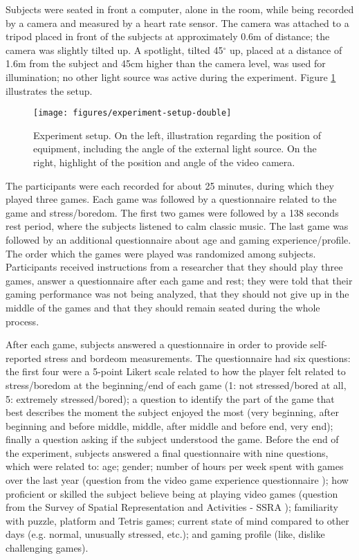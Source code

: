 Subjects were seated in front a computer, alone in the room, while being recorded by a camera and measured by a heart rate sensor. The camera was attached to a tripod placed in front of the subjects at approximately 0.6m of distance; the camera was slightly tilted up. A spotlight, tilted 45$^{\circ}$ up, placed at a distance of 1.6m from the subject and 45cm higher than the camera level, was used for illumination; no other light source was active during the experiment. Figure \ref{fig:setup} illustrates the setup.

\begin{figure}[h]
\centering
\texttt{[image: figures/experiment-setup-double]}
\caption{Experiment setup. On the left, illustration regarding the position of equipment, including the angle of the external light source. On the right, highlight of the position and angle of the video camera.}
\label{fig:setup}
\end{figure}

The participants were each recorded for about 25 minutes, during which they played three games. Each game was followed by a questionnaire related to the game and stress/boredom. The first two games were followed by a 138 seconds rest period, where the subjects listened to calm classic music. The last game was followed by an additional questionnaire about age and gaming experience/profile. The order which the games were played was randomized among subjects. Participants received instructions from a researcher that they should play three games, answer a questionnaire after each game and rest; they were told that their gaming performance was not being analyzed, that they should not give up in the middle of the games and that they should remain seated during the whole process.

After each game, subjects answered a questionnaire in order to provide self-reported stress and bordeom measurements. The questionnaire had six questions: the first four were a 5-point Likert scale related to how the player felt related to stress/boredom at the beginning/end of each game (1: not stressed/bored at all, 5: extremely stressed/bored); a question to identify the part of the game that best describes the moment the subject enjoyed the most (very beginning, after beginning and before middle, middle, after middle and before end, very end); finally a question asking if the subject understood the game. Before the end of the experiment, subjects answered a final questionnaire with nine questions, which were related to: age; gender; number of hours per week spent with games over the last year (question from the video game experience questionnaire \parencite{unsworth2015playing}); how proficient or skilled the subject believe being at playing video games (question from the Survey of Spatial Representation and Activities - SSRA \parencite{terlecki2005important}); familiarity with puzzle, platform and Tetris games; current state of mind compared to other days (e.g. normal, unusually stressed, etc.); and gaming profile (like, dislike challenging games).

